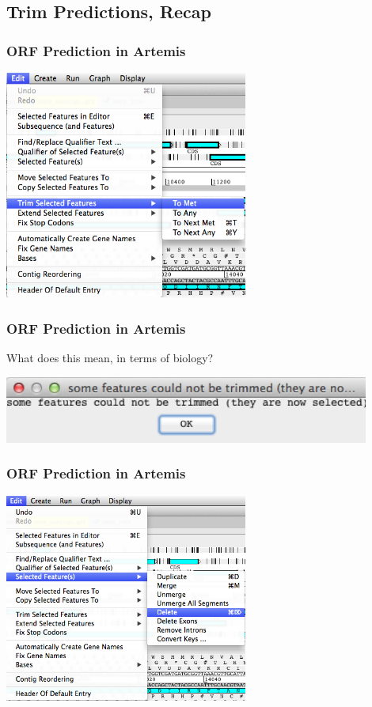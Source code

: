 \documentclass[table]{beamer}
\begin{document}
    \subsection{Trim Predictions, Recap}
    \begin{frame}
      \frametitle{ORF Prediction in Artemis}    
      \begin{center}
        \includegraphics[width=0.6\textwidth]{images/artemis_orf8}     
      \end{center}
    \end{frame}

    \begin{frame}
      \frametitle{ORF Prediction in Artemis}
      What does this mean, in terms of biology?
      \begin{center}
        \includegraphics[width=0.9\textwidth]{images/artemis_orf9}     
      \end{center}
    \end{frame}

    \begin{frame}
      \frametitle{ORF Prediction in Artemis}    
      \begin{center}
        \includegraphics[width=0.6\textwidth]{images/artemis_orf10}     
      \end{center}
    \end{frame}
\end{document}
